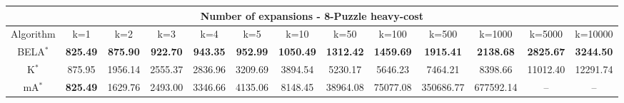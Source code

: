 \begin{tabular}{c|cccccccccccc}\toprule
\multicolumn{13}{c}{Number of expansions - 8-Puzzle heavy-cost}\\ \midrule
Algorithm & k=1 & k=2 & k=3 & k=4 & k=5 & k=10 & k=50 & k=100 & k=500 & k=1000 & k=5000 & k=10000 \\ \midrule
BELA$^*$ & \textbf{825.49} & \textbf{875.90} & \textbf{922.70} & \textbf{943.35} & \textbf{952.99} & \textbf{1050.49} & \textbf{1312.42} & \textbf{1459.69} & \textbf{1915.41} & \textbf{2138.68} & \textbf{2825.67} & \textbf{3244.50} \\
K$^*$ & 875.95 & 1956.14 & 2555.37 & 2836.96 & 3209.69 & 3894.54 & 5230.17 & 5646.23 & 7464.21 & 8398.66 & 11012.40 & 12291.74 \\
mA$^*$ & \textbf{825.49} & 1629.76 & 2493.00 & 3346.66 & 4135.06 & 8148.45 & 38964.08 & 75077.08 & 350686.77 & 677592.14 & -- & -- \\ \bottomrule 
\end{tabular}
